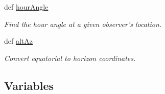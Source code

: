 \begin{DoxyCompactItemize}
def \hyperlink{namespaceamonpy_1_1sim_1_1sidereal__m_a8306e41d6c3385d3d6bb4bd07a78ec6b}{hour\-Angle}
\begin{DoxyCompactList}\small\item\em Find the hour angle at a given observer's location. \end{DoxyCompactList}\item 
def \hyperlink{namespaceamonpy_1_1sim_1_1sidereal__m_a042dd023ef6345a10bb7abd2a8e5ace2}{alt\-Az}
\begin{DoxyCompactList}\small\item\em Convert equatorial to horizon coordinates. \end{DoxyCompactList}\end{DoxyCompactItemize}
\subsection*{Variables}
